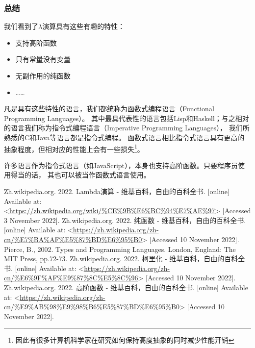 \documentclass[../main.tex]{subfiles}
\begin{document}
    \subsubsection*{总结}
      \indent 我们看到了$\lambda$演算具有这些有趣的特性：

      \begin{itemize}
        \item 支持高阶函数
        \item 只有常量没有变量
        \item 无副作用的纯函数
        \item ……
      \end{itemize}

      \indent 凡是具有这些特性的语言，我们都统称为函数式编程语言（Functional Programming Languages）。
      其中最具代表性的语言包括Lisp和Haskell；与之相对的语言我们称为指令式编程语言（Imperative Programming Languages），
      我们所熟悉的C和Java等语言都是指令式编程。
      函数式语言相比指令式语言具有更高的抽象程度，但相对应的性能上会有一些损失\footnote[1]{因此有很多计算机科学家在研究如何保持高度抽象的同时减少性能开销}。
      
      \indent 许多语言作为指令式语言（如JavaScript），本身也支持高阶函数。只要程序员使用得当的话，
      其也可以被当作函数式语言使用。

  \begin{thebibliography}{6}
     Zh.wikipedia.org. 2022. Lambda演算 - 维基百科，自由的百科全书. [online] Available at: <\url{https://zh.wikipedia.org/wiki/%CE%9B%E6%BC%94%E7%AE%97}> [Accessed 3 November 2022]. 
     Zh.wikipedia.org. 2022. 纯函数 - 维基百科，自由的百科全书. [online] Available at: <\url{https://zh.wikipedia.org/zh-cn/%E7%BA%AF%E5%87%BD%E6%95%B0}> [Accessed 10 November 2022]. 
     Pierce, B., 2002. Types and Programming Languages. London, England: The MIT Press, pp.72-73.
     Zh.wikipedia.org. 2022. 柯里化 - 维基百科，自由的百科全书. [online] Available at: <\url{https://zh.wikipedia.org/zh-cn/%E6%9F%AF%E9%87%8C%E5%8C%96}> [Accessed 10 November 2022]. 
     Zh.wikipedia.org. 2022. 高阶函数 - 维基百科，自由的百科全书. [online] Available at: <\url{https://zh.wikipedia.org/zh-cn/%E9%AB%98%E9%98%B6%E5%87%BD%E6%95%B0}> [Accessed 10 November 2022]. 
  \end{thebibliography}
\end{document}
